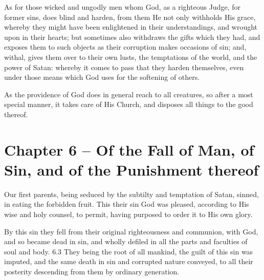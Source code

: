 \begin{outerlst}[left=0pt,labelsep=0pt]
\begin{innerlst}[resume*]
\item As for those wicked and ungodly men whom God, as a righteous Judge, for former sins, does blind and harden, from them He not only withholds His grace, whereby they might have been enlightened in their understandings, and wrought upon in their hearts; but sometimes also withdraws the gifts which they had, and exposes them to such objects as their corruption makes occasions of sin; and, withal, gives them over to their own lusts, the temptations of the world, and the power of Satan: whereby it comes to pass that they harden themselves, even under those means which God uses for the softening of others.   

\item As the providence of God does in general reach to all creatures, so after a most special manner, it takes care of His Church, and disposes all things to the good thereof.
\end{innerlst}

\item
{}
\section{Chapter 6 -- Of the Fall of Man, of Sin, and of the Punishment thereof}
\begin{innerlst}[resume*]

\item Our first parents, being seduced by the subtilty and temptation of Satan, sinned, in eating the forbidden fruit. This their sin God was pleased, according to His wise and holy counsel, to permit, having purposed to order it to His own glory.   

\item By this sin they fell from their original righteousness and communion, with God, and so became dead in sin, and wholly defiled in all the parts and faculties of soul and body.  6.3 They being the root of all mankind, the guilt of this sin was imputed, and the same death in sin and corrupted nature conveyed, to all their posterity descending from them by ordinary generation.   


\end{innerlst}
\end{outerlst}
